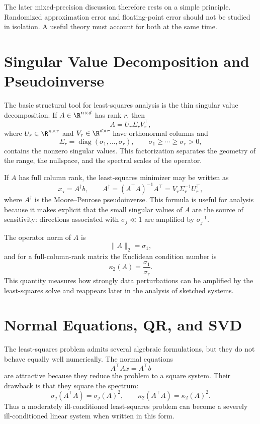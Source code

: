 The later mixed-precision discussion therefore rests on a simple principle.
Randomized approximation error and floating-point error should not be studied in
isolation. A useful theory must account for both at the same time.

\section{Singular Value Decomposition and Pseudoinverse}

The basic structural tool for least-squares analysis is the thin singular value
decomposition. If \(A \in \R^{n \times d}\) has rank \(r\), then
\[
	A = U_r \Sigma_r V_r^\top,
\]
where \(U_r \in \R^{n \times r}\) and \(V_r \in \R^{d \times r}\) have orthonormal
columns and
\[
	\Sigma_r = \operatorname{diag}(\sigma_1,\dots,\sigma_r),
	\qquad
	\sigma_1 \ge \cdots \ge \sigma_r > 0,
\]
contains the nonzero singular values. This factorization separates the geometry of
the range, the nullspace, and the spectral scales of the operator.

If \(A\) has full column rank, the least-squares minimizer may be written as
\[
	x_\star = A^\dagger b,
	\qquad
	A^\dagger = (A^\top A)^{-1}A^\top = V_r \Sigma_r^{-1} U_r^\top,
\]
where \(A^\dagger\) is the Moore--Penrose pseudoinverse. This formula is useful for
analysis because it makes explicit that the small singular values of \(A\) are the
source of sensitivity: directions associated with \(\sigma_j \ll 1\) are amplified by
\(\sigma_j^{-1}\).

The operator norm of \(A\) is
\[
	\|A\|_2 = \sigma_1,
\]
and for a full-column-rank matrix the Euclidean condition number is
\[
	\kappa_2(A) = \frac{\sigma_1}{\sigma_r}.
\]
This quantity measures how strongly data perturbations can be amplified by the
least-squares solve and reappears later in the analysis of sketched systems.

\section{Normal Equations, QR, and SVD}

The least-squares problem admits several algebraic formulations, but they do not
behave equally well numerically. The normal equations
\[
	A^\top A x = A^\top b
\]
are attractive because they reduce the problem to a square system. Their drawback
is that they square the spectrum:
\[
	\sigma_j(A^\top A) = \sigma_j(A)^2,
	\qquad
	\kappa_2(A^\top A) = \kappa_2(A)^2.
\]
Thus a moderately ill-conditioned least-squares problem can become a severely
ill-conditioned linear system when written in this form.

